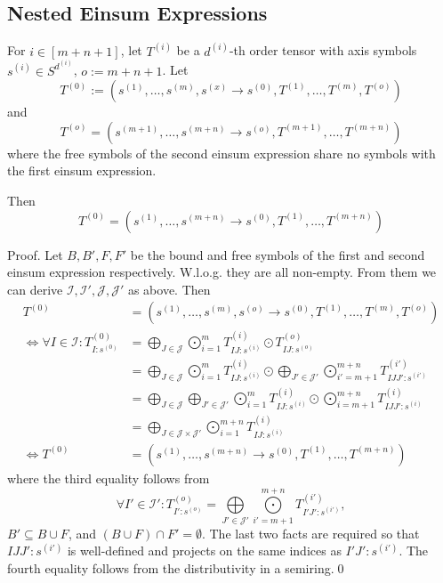 \subsection{Nested Einsum Expressions}

For $i \in [m + n + 1]$, let $T^{(i)}$ be a $d^{(i)}$-th order tensor with axis symbols $s^{(i)} \in S^{d^{(i)}}$, $o := m + n + 1$.
Let
$$T^{(0)} := (s^{(1)},\dots,s^{(m)}, s^{(x)} \rightarrow s^{(0)}, T^{(1)},\dots,T^{(m)}, T^{(o)})$$
and
$$T^{(o)} = (s^{(m + 1)},\dots,s^{(m + n)} \rightarrow s^{(o)}, T^{(m + 1)},\dots,T^{(m + n)})$$
where the free symbols of the second einsum expression share no symbols with the first einsum expression.

Then
$$T^{(0)} = (s^{(1)}, \dots, s^{(m + n)} \rightarrow s^{(0)}, T^{(1)}, \dots, T^{(m + n)})$$

Proof. Let $B, B', F, F'$ be the bound and free symbols of the first and second einsum expression respectively.
W.l.o.g. they are all non-empty.
From them we can derive $\mathcal{I}, \mathcal{I}', \mathcal{J}, \mathcal{J}'$ as above.
Then
\begin{align*}
    T^{(0)}                                              & = (s^{(1)},\dots,s^{(m)}, s^{(o)} \rightarrow s^{(0)}, T^{(1)},\dots,T^{(m)}, T^{(o)})                                                                                                             \\
    \iff \forall I \in \mathcal{I}: T^{(0)}_{I: s^{(0)}} & = \bigoplus\limits_{J \in \mathcal{J}} \bigodot\limits_{i = 1}^{m} T^{(i)}_{IJ:s^{(i)}} \odot T^{(o)}_{IJ:s^{(o)}}                                                                                 \\
                                                         & = \bigoplus\limits_{J \in \mathcal{J}} \bigodot\limits_{i = 1}^{m} T^{(i)}_{IJ:s^{(i)}} \odot \bigoplus\limits_{J' \in \mathcal{J}'} \bigodot\limits_{i' = m + 1}^{m + n} T^{(i')}_{IJJ':s^{(i')}} \\
                                                         & = \bigoplus\limits_{J \in \mathcal{J}} \bigoplus\limits_{J' \in \mathcal{J}'} \bigodot\limits_{i = 1}^{m} T^{(i)}_{IJ:s^{(i)}} \odot \bigodot\limits_{i = m + 1}^{m + n} T^{(i)}_{IJJ':s^{(i)}}    \\
                                                         & = \bigoplus\limits_{J \in \mathcal{J} \times \mathcal{J}'} \bigodot\limits_{i = 1}^{m + n} T^{(i)}_{IJ:s^{(i)}}                                                                                    \\
    \iff T^{(0)}                                         & = (s^{(1)}, \dots, s^{(m + n)} \rightarrow s^{(0)}, T^{(1)}, \dots, T^{(m + n)})
\end{align*}
where the third equality follows from
$$\forall I' \in \mathcal{I}': T^{(o)}_{I': s^{(o)}} = \bigoplus\limits_{J' \in \mathcal{J}'} \bigodot\limits_{i' = m + 1}^{m + n} T^{(i')}_{I'J':s^{(i')}},$$
$B' \subseteq B \cup F$, and $(B \cup F) \cap F' = \emptyset$. The last two facts are required so that $IJJ':s^{(i')}$ is well-defined and projects on the same indices as $I'J':s^{(i')}$.
The fourth equality follows from the distributivity in a semiring.\qed

